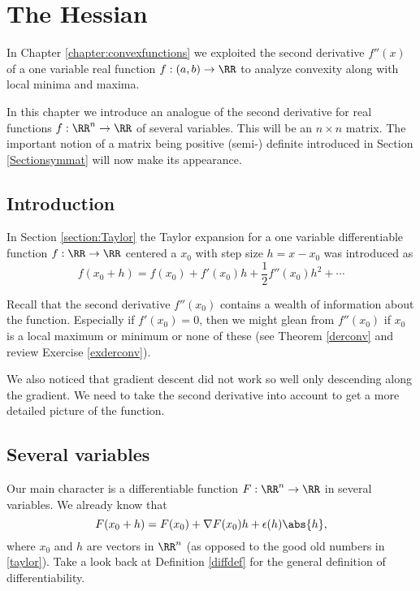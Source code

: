 \documentclass{article}
\begin{document}
\chapter{The Hessian}

In Chapter \ref{chapter:convexfunctions} we exploited the second derivative
$f''(x)$ of a one variable real function $f:(a, b) \rightarrow \RR$ to analyze
convexity along with local minima and maxima.

In this chapter we introduce an analogue of the second derivative for real functions $f:\RR^n\rightarrow \RR$ of
several variables. This will be an $n\times n$ matrix. The important notion of a matrix
being positive (semi-) definite introduced in Section \ref{Sectionsymmat} will now
make its appearance.

\section{Introduction}

In Section \ref{section:Taylor} the Taylor expansion for a one variable differentiable
function $f:\RR\rightarrow \RR$ centered a $x_0$ with step size
$h  = x - x_0$ was introduced as
\begin{equation}\label{taylor}
f(x_0 + h) = f(x_0) + f'(x_0) h + \frac{1}{2} f''(x_0) h^2 + \cdots
\end{equation}

Recall that the second derivative $f''(x_0)$ contains a
wealth of information about the function. Especially if $f'(x_0) = 0$,
then we might glean from $f''(x_0)$ if $x_0$ is a local maximum or
minimum or none of these (see Theorem \ref{derconv} and review Exercise \ref{exderconv}).

We also noticed that gradient descent did not work so well only
descending along the gradient. We need to take the second
derivative into account to get a more detailed picture of the
function.

\section{Several variables}

Our main character is a differentiable function $F:\RR^n\rightarrow \RR$ in
several variables. We already know that
$$
F(x_0 + h) = F(x_0) + \nabla F(x_0) h + \epsilon(h) \abs{h},
$$
where $x_0$ and $h$ are vectors in $\RR^n$ (as opposed to the good old
numbers in \eqref{taylor}). Take a look back at Definition \ref{diffdef} for
the general definition of differentiability.
\end{document}
